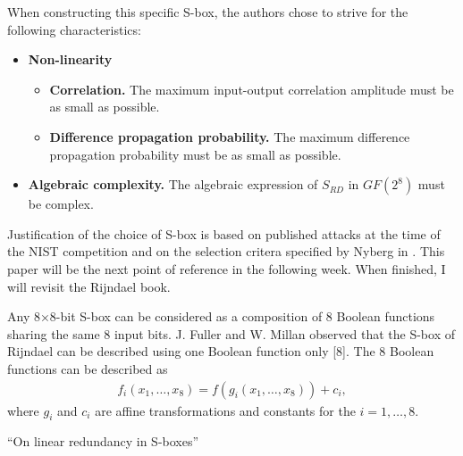 When constructing this specific S-box, the authors chose to strive for the following characteristics:
\begin{itemize}
	\item \textbf{Non-linearity}
	\begin{itemize}
		\item \textbf{Correlation.} The maximum input-output correlation amplitude must be as small as possible.
		\item \textbf{Difference propagation probability.} The maximum difference propagation probability must be as small as possible.
	\end{itemize}
	\item \textbf{Algebraic complexity.} The algebraic expression of $S_{RD}$ in $GF(2^8)$ must be complex.
\end{itemize}

Justification of the choice of S-box is based on published attacks at the time of the NIST competition and on the selection critera specified by Nyberg in \cite{Nyberg1994-DUM}. This paper will be the next point of reference in the following week. When finished, I will revisit the Rijndael book.

Any 8×8-bit S-box can be considered as a composition of 8 Boolean functions
sharing the same 8 input bits. J. Fuller and W. Millan observed that the S-box
of Rijndael can be described using one Boolean function only [8]. The 8 Boolean
functions can be described as
\begin{align*}
f_i(x_1,\dots,x_8) = f(g_i(x_1,\dots,x_8)) + c_i,
\end{align*}
where $g_i$ and $c_i$ are affine transformations and constants for the $i = 1,\dots,8$.

``On linear redundancy in S-boxes''